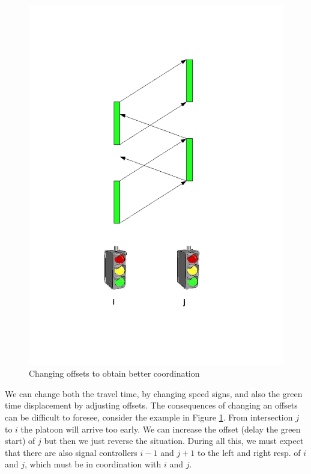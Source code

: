 \begin{figure}[ht]
\centering
\includegraphics[scale=0.2]{change_offset.png}
\caption{Changing offsets to obtain better coordination}
\label{fig:change_offset}
\end{figure}

We can change both the travel time, by changing speed signs, and also the green time displacement by adjusting offsets. The consequences of changing an offsets can be difficult to foresee, consider the example in Figure \ref{fig:change_offset}. From intersection $j$ to $i$ the platoon will arrive too early. We can increase the offset (delay the green start) of $j$ but then we just reverse the situation. During all this, we must expect that there are also signal controllers $i-1$ and $j+1$ to the left and right resp. of $i$ and $j$, which must be in coordination with $i$ and $j$.

